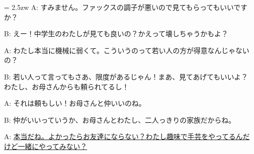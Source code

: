 \documentclass[11pt]{amsart}
\title{}
\author{}
\newenvironment{hangall}[1]{\hangindent = 2.5zw\everypar{\hangindent = 2.5zw}}{}
\begin{document}
\maketitle
\begin{hangall}{}%
A: すみません。ファックスの調子が悪いので見てもらってもいいですか？

B: えー！中学生のわたしが見ても良いの？かえって壊しちゃうかもよ？

A: わたし本当に機械に弱くて。こういうのって若い人の方が得意なんじゃないの？

B: 若い人って言ってもさあ、限度があるじゃん！まあ、見てあげてもいいよ？わたし、お母さんからも頼られてるし！

A: それは頼もしい！お母さんと仲いいのね。

B: 仲がいいっていうか、お母さんとわたし、二人っきりの家族だからね。

A: \ul{本当だね。よかったらお友達にならない？わたし趣味で手芸をやってるんだけど一緒にやってみない？}\end{hangall}
\end{document}

